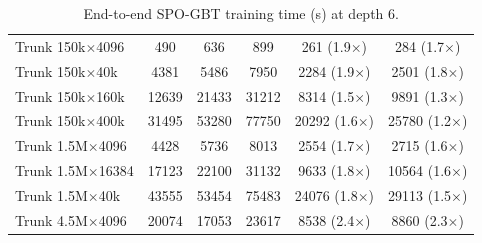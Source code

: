 \begin{table}[p]
\begin{tabular}{l|ccc|cc}
        Trunk 150k$\times$4096 & 490 & 636 & 899 & 261 (1.9$\times$) & 284 (1.7$\times$) \\
        Trunk 150k$\times$40k & 4381 & 5486 & 7950 & 2284 (1.9$\times$) & 2501 (1.8$\times$) \\
        Trunk 150k$\times$160k & 12639 & 21433 & 31212 & 8314 (1.5$\times$) & 9891 (1.3$\times$) \\
        Trunk 150k$\times$400k & 31495 & 53280 & 77750 & 20292 (1.6$\times$) & 25780 (1.2$\times$) \\
        Trunk 1.5M$\times$4096 & 4428 & 5736 & 8013 & 2554 (1.7$\times$) & 2715 (1.6$\times$) \\
        Trunk 1.5M$\times$16384 & 17123 & 22100 & 31132 & 9633 (1.8$\times$) & 10564 (1.6$\times$) \\
        Trunk 1.5M$\times$40k & 43555 & 53454 & 75483 & 24076 (1.8$\times$) & 29113 (1.5$\times$) \\
        Trunk 4.5M$\times$4096 & 20074 & 17053 & 23617 & 8538 (2.4$\times$) & 8860 (2.3$\times$) \\
        \hline
    \end{tabular}
    \caption{End-to-end SPO-GBT training time (s) at depth 6.}
    \label{tab:train-time-gbt-depth6}
\end{table}
